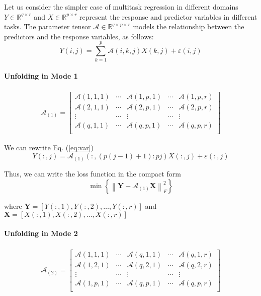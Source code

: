 Let us consider the simpler case of multitask regression in different domains $Y\in \mathbb{R}^{q\times r}$ and $X\in \mathbb{R}^{p\times r}$ represent the response and predictor variables in different tasks. The parameter tensor $\mathcal{A}\in \mathbb{R}^{q\times p\times r}$ models the relationship between the predictors and the response variables, as follows:
\begin{equation}
Y(i, j) = \sum_{k=1}^{p}\mathcal{A}(i, k, j)X(k, j) + \varepsilon(i, j)
\label{eq:var}
\end{equation}
\paragraph{Unfolding in Mode 1}
\begin{align*}
\mathcal{A}_{(1)}= \left[ \begin{array}{ccccc}
\mathcal{A}(1, 1, 1) & \cdots & \mathcal{A}(1, p, 1) & \cdots &\mathcal{A}(1, p, r)\\
\mathcal{A}(2, 1, 1) & \cdots & \mathcal{A}(2, p, 1) & \cdots &\mathcal{A}(2, p, r)\\
\vdots & \cdots& \vdots&\cdots&\vdots\\
\mathcal{A}(q, 1, 1) & \cdots & \mathcal{A}(q, p, 1) & \cdots &\mathcal{A}(q, p, r)\\ \end{array} \right]
\end{align*}

We can rewrite Eq. (\ref{eq:var})
\begin{equation}
Y(:, j) = \mathcal{A}_{(1)}(:,(p(j-1)+1):pj )X(:, j) + \varepsilon(:, j)
\end{equation}

Thus, we can write the loss function in the compact form
\begin{equation}
\min\left\{\left\|\bm{Y} - \mathcal{A}_{(1)}\bm{X}\right\|_F^2\right\}
\label{eq:greedyFold1}
\end{equation}

\noindent where $\bm{Y} = [Y(:, 1), Y(:, 2), \ldots, Y(:, r)]$ and $\bm{X} = [X(:, 1), X(:, 2), \ldots, X(:, r)]$


\paragraph{Unfolding in Mode 2}
\begin{align*}
\mathcal{A}_{(2)}= \left[ \begin{array}{ccccc}
\mathcal{A}(1, 1, 1) & \cdots & \mathcal{A}(q, 1, 1) & \cdots &\mathcal{A}(q, 1, r)\\
\mathcal{A}(1, 2, 1) & \cdots & \mathcal{A}(q, 2, 1) & \cdots &\mathcal{A}(q, 2, r)\\
\vdots & \cdots& \vdots&\cdots&\vdots\\
\mathcal{A}(1, p, 1) & \cdots & \mathcal{A}(q, p, 1) & \cdots &\mathcal{A}(q, p, r)\\ \end{array} \right]
\end{align*}

